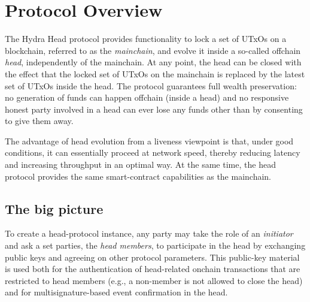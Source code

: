 \section{Protocol Overview}\label{sec:overview}



The Hydra Head protocol provides functionality to lock a set of UTxOs on a
blockchain, referred to as the \emph{mainchain}, and evolve it inside a
so-called offchain \emph{head}, independently of the mainchain. At any point,
the head can be closed with the effect that the locked set of UTxOs on the
mainchain is replaced by the latest set of UTxOs inside the head. The protocol
guarantees full wealth preservation: no generation of funds can happen offchain
(inside a head) and no responsive honest party involved in a head can ever lose
any funds other than by consenting to give them away.

The advantage of head evolution from a liveness viewpoint is that, under good
conditions, it can essentially proceed at network speed, thereby reducing
latency and increasing throughput in an optimal way. At the same time, the head
protocol provides the same smart-contract capabilities as the mainchain.

\subsection{The big picture}\label{sec:overview_bp}

To create a head-protocol instance, any party may take the role of an
\emph{initiator} and ask a set parties, the \emph{head members}, to
participate in the head by exchanging public keys and agreeing on other protocol parameters. 
This public-key material is used both
for the authentication of head-related onchain transactions that
are restricted to head members (e.g., a non-member is not allowed
to close the head) and for multisignature-based event confirmation
in the head.

